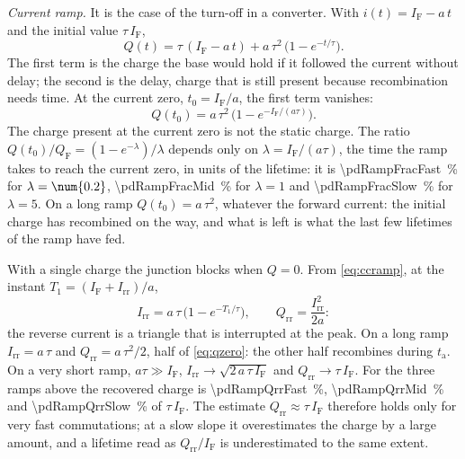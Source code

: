 \documentclass[10pt,a4paper]{scrartcl}
\newcommand{\IF}{I_\mathrm{F}}
\newcommand{\Irr}{I_\mathrm{rr}}
\newcommand{\Qrr}{Q_\mathrm{rr}}
\newcommand{\ta}{t_\mathrm{a}}
\newcommand{\Tone}{T_1}
\newcommand{\QF}{Q_\mathrm{F}}
\begin{document}
\emph{Current ramp.} It is the case of the turn-off in a converter. With $i(t) = \IF - a\,t$ and the initial value $\tau\,\IF$,
\begin{equation}
Q(t) = \tau\,(\IF - a\,t) + a\,\tau^2\,\bigl(1 - e^{-t/\tau}\bigr) .
\label{eq:ccramp}
\end{equation}
The first term is the charge the base would hold if it followed the current without delay; the second is the delay, charge that is still present because recombination needs time. At the current zero, $t_0 = \IF/a$, the first term vanishes:
\begin{equation}
Q(t_0) = a\,\tau^2\,\bigl(1 - e^{-\IF/(a\tau)}\bigr) .
\label{eq:qzero}
\end{equation}
The charge present at the current zero is not the static charge. The ratio $Q(t_0)/\QF = (1 - e^{-\lambda})/\lambda$ depends only on $\lambda = \IF/(a\tau)$, the time the ramp takes to reach the current zero, in units of the lifetime: it is \SI{\pdRampFracFast}{\percent} for $\lambda = \num{\pdRampLamFast}$, \SI{\pdRampFracMid}{\percent} for $\lambda = 1$ and \SI{\pdRampFracSlow}{\percent} for $\lambda = 5$. On a long ramp $Q(t_0) = a\,\tau^2$, whatever the forward current: the initial charge has recombined on the way, and what is left is what the last few lifetimes of the ramp have fed.

With a single charge the junction blocks when $Q = 0$. From \eqref{eq:ccramp}, at the instant $\Tone = (\IF + \Irr)/a$,
\begin{equation}
\Irr = a\,\tau\,\bigl(1 - e^{-\Tone/\tau}\bigr) , \qquad \Qrr = \frac{\Irr^2}{2a} :
\label{eq:ccpeak}
\end{equation}
the reverse current is a triangle that is interrupted at the peak. On a long ramp $\Irr = a\,\tau$ and $\Qrr = a\,\tau^2/2$, half of \eqref{eq:qzero}: the other half recombines during $\ta$. On a very short ramp, $a\tau \gg \IF$, $\Irr \to \sqrt{2\,a\,\tau\,\IF}$ and $\Qrr \to \tau\,\IF$. For the three ramps above the recovered charge is \SI{\pdRampQrrFast}{\percent}, \SI{\pdRampQrrMid}{\percent} and \SI{\pdRampQrrSlow}{\percent} of $\tau\,\IF$. The estimate $\Qrr \approx \tau\,\IF$ therefore holds only for very fast commutations; at a slow slope it overestimates the charge by a large amount, and a lifetime read as $\Qrr/\IF$ is underestimated to the same extent.
\end{document}
